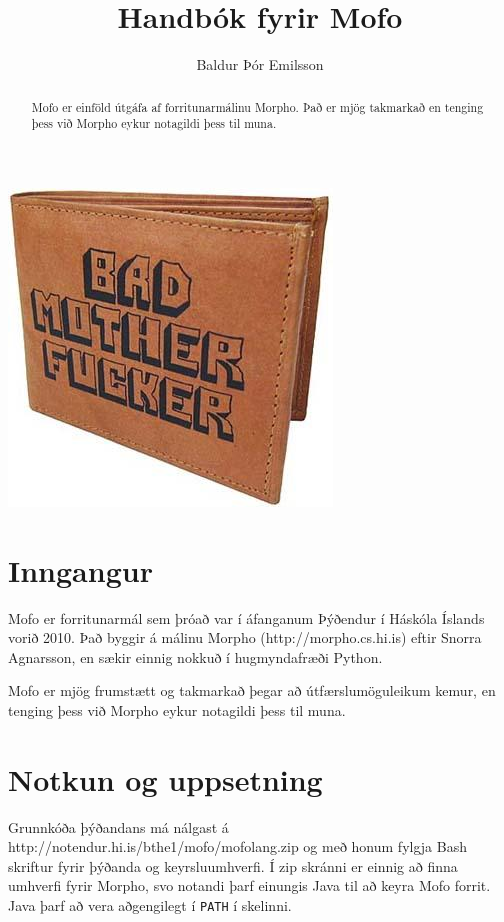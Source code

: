 \documentclass[12pt,a4paper]{article}
\begin{document}
\sloppy
\title{Handbók fyrir Mofo}
\author{Baldur Þór Emilsson}
\maketitle
\begin{center}
\includegraphics{wallet.jpg}
\end{center}
\pagebreak

\begin{abstract}
Mofo er einföld útgáfa af forritunarmálinu Morpho. Það er mjög takmarkað en tenging þess við Morpho eykur notagildi þess til muna.
\end{abstract}
\pagebreak

\tableofcontents
\pagebreak

\section{Inngangur}
Mofo er forritunarmál sem þróað var í áfanganum Þýðendur í Háskóla Íslands vorið 2010.
Það byggir á málinu Morpho (http://morpho.cs.hi.is) eftir Snorra Agnarsson, en sækir einnig nokkuð
í hugmyndafræði Python.

Mofo er mjög frumstætt og takmarkað þegar að útfærslumöguleikum kemur, en tenging þess við Morpho
eykur notagildi þess til muna.
\pagebreak

\section{Notkun og uppsetning}
Grunnkóða þýðandans má nálgast á http://notendur.hi.is/bthe1/mofo/mofolang.zip og með honum fylgja Bash skriftur fyrir
þýðanda og keyrsluumhverfi. Í zip skránni er einnig að finna umhverfi fyrir Morpho, svo notandi þarf einungis Java
til að keyra Mofo forrit. Java þarf að vera aðgengilegt í {\tt PATH} í skelinni.
\end{document}
